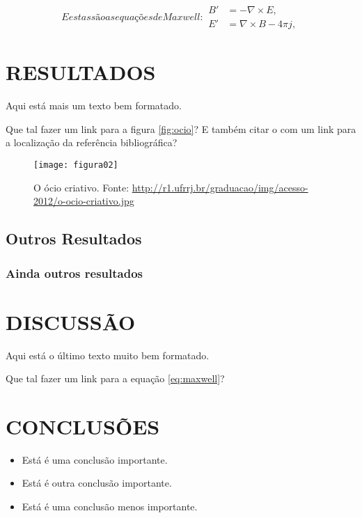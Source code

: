 \begin{subequations}\label{eq:maxwell}
E estas são as equações de Maxwell:
\begin{align}
        B'&=-\nabla \times E,\\
        E'&=\nabla \times B - 4\pi j,
\end{align}
\end{subequations}

\section{RESULTADOS}

Aqui está mais um texto bem formatado. \blindtext[1]

Que tal fazer um link para a figura \autoref{fig:ocio}? E também citar o  com um 
link para a localização da referência bibliográfica?

\begin{figure}[!ht]
\label{fig:ocio}
\centering
\texttt{[image: figura02]}
\caption[O ócio criativo.]{O ócio criativo. Fonte: 
\url{http://r1.ufrrj.br/graduacao/img/acesso-2012/o-ocio-criativo.jpg}}
\end{figure}

\subsection{Outros Resultados}

\blindtext[1]

\subsubsection{Ainda outros resultados}

\blindtext[1]

\section{DISCUSSÃO}

Aqui está o último texto muito bem formatado. \blindtext[2]

Que tal fazer um link para a equação \autoref{eq:maxwell}?

\section{CONCLUSÕES}

\begin{itemize}
  \item Está é uma conclusão importante.
  \item Está é outra conclusão importante.
  \item Está é uma conclusão menos importante.
\end{itemize}

